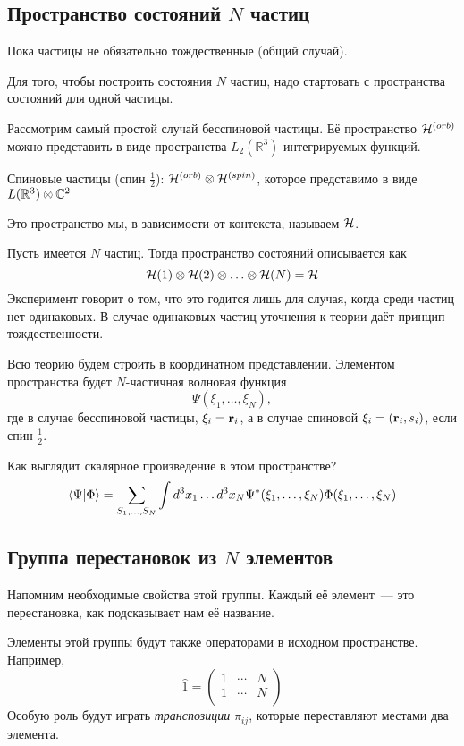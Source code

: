 \subsection{Пространство состояний $N$ частиц}
Пока частицы не обязательно тождественные (общий случай).

Для того, чтобы построить состояния $N$ частиц, надо стартовать с пространства состояний для одной частицы.

Рассмотрим самый простой случай бесспиновой частицы. Её пространство $\H^{(orb)}$ можно представить в виде пространства $L_2(\mathbb R^3)$ интегрируемых функций.

Спиновые частицы (спин $\frac12$): $\H^{(orb)} \otimes \H^{(spin)}$, которое представимо в виде $L(\R^3) \otimes \mathbb C^{2}$

Это пространство мы, в зависимости от контекста, называем $\H$.

Пусть имеется $N$ частиц. Тогда пространство состояний описывается как
$$
    \H(1) \otimes \H(2) \otimes \ldots \otimes \H(N) = \H
$$
Эксперимент говорит о том, что это годится лишь для случая, когда среди частиц нет одинаковых. В случае одинаковых частиц уточнения к теории даёт принцип тождественности. 

Всю теорию будем строить в координатном представлении. Элементом пространства будет $N$-частичная волновая функция
$$
    \Psi(\xi_1, \ldots, \xi_N),
$$
где в случае бесспиновой частицы, $\xi_i = \bf r_i$, а в случае спиновой $\xi_i = (\bf r_i, s_i)$, если спин $\frac12$. 

Как выглядит скалярное произведение в этом пространстве?
$$
    \qs{\Psi}{\Phi} = \sum_{S_1, \ldots, S_N} \int d^3 x_1 \ldots d^3 x_N \Psi^\ast(\xi_1, \ldots, \xi_N) \Phi(\xi_1, \ldots, \xi_N)
$$
\subsection{Группа перестановок из $N$ элементов}
Напомним необходимые свойства этой группы. Каждый её элемент~--- это перестановка, как подсказывает нам её название.

Элементы этой группы будут также операторами в исходном пространстве. Например,
$$
    \hat 1 = \begin{pmatrix}
               1 & \cdots & N \\
               1 & \cdots & N \\
             \end{pmatrix}
$$
Особую роль будут играть \emph{транспозиции} $\pi_{ij}$, которые переставляют местами два элемента.

